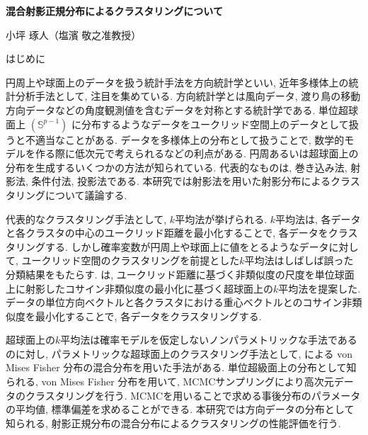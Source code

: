 \documentclass[a4j,11pt]{jarticle}
\makeatletter
\def\section{\@startsection{section}{1}{\z@}
   {0.8\Cvs \@plus.5\Cdp \@minus.2\Cdp}
   {0.2\Cvs \@plus.3\Cdp}
   {\normalfont \Large \bfseries}}
\makeatother
\begin{document}


\begin{center}
{\Large \textbf{混合射影正規分布によるクラスタリングについて}}
\end{center}
\begin{flushright}
小坪 琢人（塩濱 敬之准教授）
\end{flushright}
\vspace{-3zh}


\section{はじめに}

円周上や球面上のデータを扱う統計手法を方向統計学といい, 近年多様体上の統計分析手法として, 注目を集めている. 方向統計学とは風向データ, 渡り鳥の移動方向データなどの角度観測値を含むデータを対称とする統計学である. 単位超球面上 $(\mathbb{S}^{p-1})$ に分布するようなデータをユークリッド空間上のデータとして扱うと不適当なことがある. データを多様体上の分布として扱うことで, 数学的モデルを作る際に低次元で考えられるなどの利点がある. 円周あるいは超球面上の分布を生成するいくつかの方法が知られている. 代表的なものは, 巻き込み法, 射影法, 条件付法, 投影法である. 本研究では射影法を用いた射影分布によるクラスタリングについて議論する.

代表的なクラスタリング手法として, $k$平均法が挙げられる. $k$平均法は, 各データと各クラスタの中心のユークリッド距離を最小化することで, 各データをクラスタリングする. しかし確率変数が円周上や球面上に値をとるようなデータに対して, ユークリッド空間のクラスタリングを前提とした$k$平均法はしばしば誤った分類結果をもたらす. \citet{SKMcluster}は, ユークリッド距離に基づく非類似度の尺度を単位球面上に射影したコサイン非類似度の最小化に基づく超球面上の$k$平均法を提案した. データの単位方向ベクトルと各クラスタにおける重心ベクトルとのコサイン非類似度を最小化することで, 各データをクラスタリングする. 

超球面上の$k$平均法は確率モデルを仮定しないノンパラメトリックな手法であるのに対し,  パラメトリックな超球面上のクラスタリング手法として, \citet{Gopal}による von Mises Fisher 分布の混合分布を用いた手法がある. 単位超級面上の分布として知られる, von Mises Fisher 分布を用いて, MCMCサンプリングにより高次元データのクラスタリングを行う. MCMCを用いることで求める事後分布のパラメータの平均値, 標準偏差を求めることができる. 本研究では方向データの分布として知られる, 射影正規分布の混合分布によるクラスタリングの性能評価を行う. 
\end{document}
